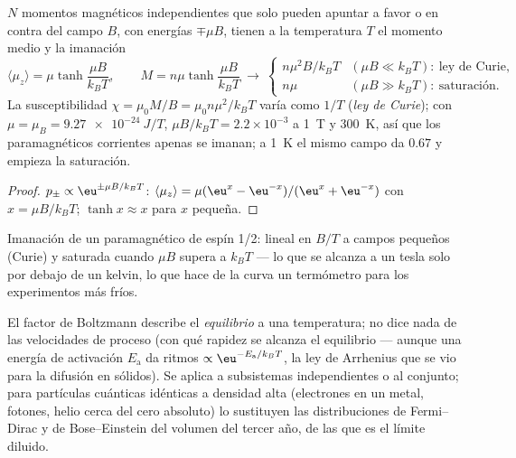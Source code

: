 \begin{proposition}\label{prop:b2:boltzmann-factor:curie}
$N$ momentos magnéticos independientes que solo pueden apuntar a favor o en contra
del campo $B$, con energías $\mp\mu B$, tienen a la temperatura $T$ el momento
medio y la imanación
\[
\langle\mu_z\rangle = \mu\tanh\frac{\mu B}{k_BT}, \qquad
M = n\mu\tanh\frac{\mu B}{k_BT}
\ \longrightarrow\
\begin{cases} n\mu^2B/k_BT & (\mu B \ll k_BT):\ \text{ley de Curie}, \\ n\mu & (\mu B \gg k_BT):\ \text{saturación}. \end{cases}
\]
La susceptibilidad $\chi = \mu_0M/B = \mu_0n\mu^2/k_BT$ varía como $1/T$
(\emph{ley de Curie}\index{ley de Curie}); con $\mu = \mu_B = \qty{9.27e-24}{J/T}$,
$\mu B/k_BT = 2.2 \times 10^{-3}$ a \qty{1}{T} y \qty{300}{K}, así que los
paramagnéticos corrientes apenas se imanan; a \qty{1}{K} el mismo campo da
$0.67$ y empieza la saturación.
\end{proposition}

\begin{proof}
$p_\pm \propto\eu^{\pm\mu B/k_BT}$: $\langle\mu_z\rangle = \mu(\eu^x - \eu^{-x})/(\eu^x +
\eu^{-x})$ con $x = \mu B/k_BT$; $\tanh x \approx x$ para $x$ pequeña.
\end{proof}

\begin{omfigure}

{\small Imanación de un paramagnético de espín 1/2: lineal en $B/T$ a
campos pequeños (Curie) y saturada cuando $\mu B$ supera a $k_BT$ --- lo que se alcanza
a un tesla solo por debajo de un kelvin, lo que hace de la curva un termómetro
para los experimentos más fríos.}
\end{omfigure}

\begin{remark}\label{rem:b2:boltzmann-factor:limits}
El factor de Boltzmann describe el \emph{equilibrio} a una temperatura; no
dice nada de las velocidades de proceso (con qué rapidez se alcanza el equilibrio --- aunque
una energía de activación $E_{\text{a}}$ da ritmos $\propto\eu^{-E_{\text{a}}/k_BT}$,
la ley de Arrhenius que se vio para la difusión en sólidos). Se aplica a
subsistemas independientes o al conjunto; para partículas cuánticas
idénticas a densidad alta (electrones en un metal, fotones, helio cerca del
cero absoluto) lo sustituyen las distribuciones de Fermi--Dirac y de
Bose--Einstein del volumen del tercer año, de las que es el límite diluido.
\end{remark}

